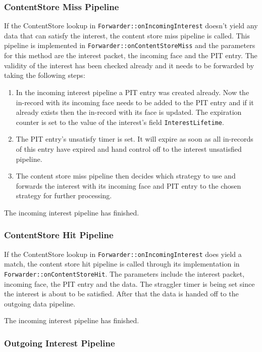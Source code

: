 \subsubsection{ContentStore Miss Pipeline}

If the ContentStore lookup in \texttt{Forwarder::onIncomingInterest} doesn't yield any data that can satisfy the interest, the content store miss pipeline is called. This pipeline is implemented in \texttt{Forwarder::onContentStoreMiss} and the parameters for this method are the interest packet, the incoming face and the PIT entry. The validity of the interest has been checked already and it needs to be forwarded by taking the following steps:

\begin{enumerate}
\item In the incoming interest pipeline a PIT entry was created already. Now the in-record with its incoming face needs to be added to the PIT entry and if it already exists then the in-record with its face is updated. The expiration counter is set to the value of the interest's field \texttt{InterestLifetime}.
\item The PIT entry's unsatisfy timer is set. It will expire as soon as all in-records of this entry have expired and hand control off to the interest unsatisfied pipeline.
\item The content store miss pipeline then decides which strategy to use and forwards the interest with its incoming face and PIT entry to the chosen strategy for further processing.
\end{enumerate}

The incoming interest pipeline has finished.

\subsubsection{ContentStore Hit Pipeline}

If the ContentStore lookup in \texttt{Forwarder::onIncomingInterest} does yield a match, the content store hit pipeline is called through its implementation in \texttt{Forwarder::onContentStoreHit}. The parameters include the interest packet, incoming face, the PIT entry and the data. The straggler timer is being set since the interest is about to be satisfied. After that the data is handed off to the outgoing data pipeline.

The incoming interest pipeline has finished.

\subsubsection{Outgoing Interest Pipeline}

